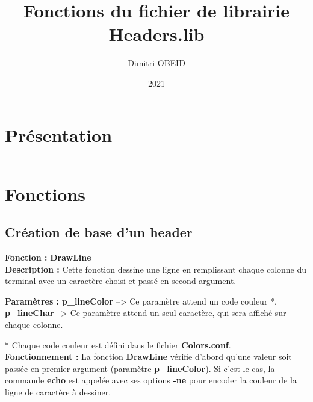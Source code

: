\documentclass[a4paper,10pt]{article}
\title{Fonctions du fichier de librairie Headers.lib}
\author{Dimitri OBEID}
\date{2021}
\begin{document}
 \maketitle
 \tableofcontents
 \newpage

\color{red}
\section{Présentation}\color{white}

\color{red}\par\noindent\rule{\textwidth}{0.4pt}\color{white}

\color{red}
\section{Fonctions}\color{white}

\color{green}
\subsection{Création de base d'un header}\color{white}

\textbf{Fonction : }\color{mauve}\textbf{DrawLine}\color{white}\\[1\baselineskip]
\textbf{Description :}\linebreak
Cette fonction dessine une ligne en remplissant chaque colonne du terminal avec un caractère choisi et passé en second argument.\linebreak

\textbf{Paramètres :}\linebreak
\color{orange}\textbf{p\_lineColor }\color{white} --> Ce paramètre attend un code couleur *.\linebreak
\color{orange}\textbf{p\_lineChar }\color{white} --> Ce paramètre attend un seul caractère, qui sera affiché sur chaque colonne.\linebreak

* Chaque code couleur est défini dans le fichier \color{lime}\textbf{Colors.conf}\color{white}.\\[1\baselineskip]

\textbf{Fonctionnement :}\linebreak
La fonction \color{mauve}\textbf{DrawLine }\color{white} vérifie d'abord qu'une valeur soit passée en premier argument (paramètre \color{orange}\textbf{p\_lineColor}\color{white}). Si c'est le cas, la commande \color{gray}\textbf{echo }\color{white} est appelée avec ses options \color{gray}\textbf{-ne }\color{white} pour encoder la couleur de la ligne de caractère à dessiner.\\[1\baselineskip]
\end{document}
